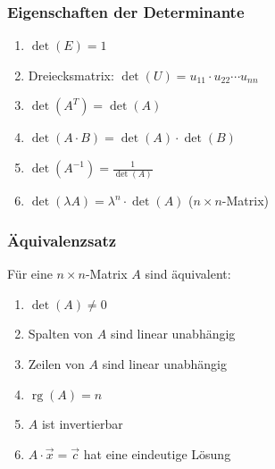 \subsubsection{Eigenschaften der Determinante}
\begin{enumerate}
    \item $\det(E) = 1$
    \item Dreiecksmatrix: $\det(U) = u_{11} \cdot u_{22} \cdots u_{nn}$
    \item $\det(A^T) = \det(A)$
    \item $\det(A \cdot B) = \det(A) \cdot \det(B)$
    \item $\det(A^{-1}) = \frac{1}{\det(A)}$
    \item $\det(\lambda A) = \lambda^n \cdot \det(A)$ \quad ($n \times n$-Matrix)
\end{enumerate}

\subsubsection{Äquivalenzsatz}
Für eine $n \times n$-Matrix $A$ sind äquivalent:
\begin{enumerate}
    \item $\det(A) \neq 0$
    \item Spalten von $A$ sind linear unabhängig
    \item Zeilen von $A$ sind linear unabhängig
    \item $\operatorname{rg}(A) = n$
    \item $A$ ist invertierbar
    \item $A \cdot \vec{x} = \vec{c}$ hat eine eindeutige Lösung
\end{enumerate}